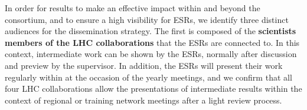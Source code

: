 


In order for \acronym results to make an effective impact within
and beyond the consortium, and to ensure a high visibility for ESRs, 
we identify three distinct audiences for the dissemination strategy. 
The first %
is composed of the \textbf{scientists members of the LHC collaborations}
that the ESRs are connected to. In this context,
intermediate work can be shown by the ESRs,
normally after discussion and preview by the supervisor. 
In addition, the ESRs will present their work
regularly within \acronym at the occasion of the yearly meetings,    
and we confirm that all four LHC collaborations allow 
the presentations of intermediate results within the context of regional or
training network meetings after a light review process. 

